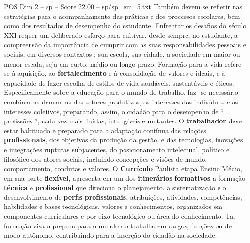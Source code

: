 \begin{textsample}{POS Dim 2 – sp – Score 22.00 – sp/sp\_em\_5.txt}
Também devem se refletir nas estratégias para o acompanhamento das práticas e dos processos escolares, bem como dos resultados de desempenho do estudante.
Enfrentar os desafios do século XXI requer um deliberado esforço para cultivar, desde sempre, no estudante, a compreensão da importância de cumprir com as suas responsabilidades pessoais e sociais, em diversos contextos : sua escola, sua cidade, a sociedade em maior ou menor escala, seja em curto, médio ou longo prazo.
Formação para a vida refere -se à aquisição, ao \textbf{fortalecimento} e à consolidação de valores e ideais, e à capacidade de fazer escolha de estilos de vida saudáveis, sustentáveis e éticos.
Especificamente sobre a educação para o mundo do trabalho, faz -se necessário combinar as demandas dos setores produtivos, os interesses dos indivíduos e os interesses coletivos, preparando, assim, o cidadão para o desempenho de “ profissões ”, cada vez mais fluidas, intangíveis e mutantes.
O \textbf{trabalhador} deve estar habituado e preparado para a adaptação contínua das relações \textbf{profissionais}, dos objetivos da produção da gestão, e das tecnologias, inovações e integrações rupturas subjacentes, do posicionamento intelectual, político e filosófico dos atores sociais, incluindo concepções e visões de mundo, comportamento, condutas e valores.
O \textbf{Currículo} Paulista etapa Ensino Médio, em sua parte \textbf{flexível}, apresenta em um dos \textbf{itinerários} \textbf{formativos} a formação \textbf{técnica} e \textbf{profissional} que direciona o planejamento, a sistematização e o desenvolvimento de \textbf{perfis} \textbf{profissionais}, atribuições, atividades, competências, habilidades e bases tecnológicas, valores e conhecimentos, organizados em componentes curriculares e por eixo tecnológico ou área do conhecimento.
Tal formação visa o preparo para o mundo do trabalho em cargos, funções ou de modo autônomo, contribuindo para a inserção do cidadão na sociedade.

\end{textsample}
